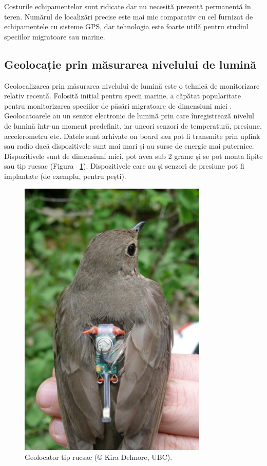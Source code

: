 \documentclass[11pt,onehalfspacing]{elife}
\begin{document}
Costurile echipamentelor sunt ridicate dar nu necesită prezență permanentă în teren. Numărul de localizări precise este mai mic comparativ cu cel furnizat de echipamentele cu sisteme GPS, dar tehnologia este foarte utilă pentru studiul speciilor migratoare sau marine.

\subsection{Geolocație prin măsurarea nivelului de lumină}

Geolocalizarea prin măsurarea nivelului de lumină este o tehnică de monitorizare relativ recentă. Folosită inițial pentru specii marine, a căpătat popularitate pentru monitorizarea speciilor de păsări migratoare de dimensiuni mici \citep{Silvy2012}. Geolocatoarele au un senzor electronic de lumină prin care înregistrează nivelul de lumină într-un moment predefinit, iar uneori senzori de temperatură, presiune, accelerometru etc. Datele sunt arhivate on board sau pot fi transmite prin uplink sau radio dacă dispozitivele sunt mai mari și au surse de energie mai puternice. Dispozitivele sunt de dimensiuni mici, pot avea sub 2 grame și se pot monta lipite sau tip rucsac \citep{Bridge2011} (Figura ~\ref{fig5}). Dispozitivele care au și senzori de presiune pot fi implantate (de exemplu, pentru pești).
\begin{figure}[ht]
\includegraphics[width=9cm]{Fig5.jpg}
\caption{Geolocator tip rucsac (© Kira Delmore, UBC).} \label{fig5}
\end{figure}
\end{document}

